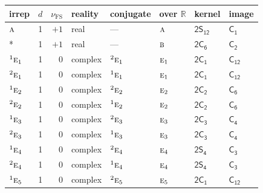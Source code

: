 \documentclass[10pt,a4paper]{article}
\numberwithin{equation}{section}
\newcommand{\grp}[1]{\mathsf{#1}}
\newcommand{\irr}[1]{\text{\normalfont\scshape #1}}
\newcommand{\conjpair}[1]{{}^{#1}}
\newcommand{\detbox}[1]{{\setlength{\fboxsep}{1pt}\fbox{#1}}}
\newcommand{\fsind}{\nu_{\mathrm{FS}}}
\begin{document}
{\small\renewcommand{\arraystretch}{1.25}\setlength{\tabcolsep}{4pt}\begin{longtable}{@{}lrrlllll@{}}\toprule
irrep & $d$ & $\fsind$ & reality & conjugate & over $\mathbb{R}$ & kernel & image\\\midrule\endhead
\bottomrule\endfoot\endlastfoot
$\irr{a}$ & 1 & $+1$ & real & --- & $\irr{a}$ & \href{2S12.pdf}{$\grp{2S_{12}}$} & \href{../../../rotation/data/pdf/C1.pdf}{$\grp{C_{1}}$}\\*
\detbox{$\irr{b}$} & 1 & $+1$ & real & --- & $\irr{b}$ & \href{2C6.pdf}{$\grp{2C_{6}}$} & \href{../../../rotation/data/pdf/C2.pdf}{$\grp{C_{2}}$}\\
$\conjpair{1}\irr{e}_{1}$ & 1 & $0$ & complex & $\conjpair{2}\irr{e}_{1}$ & $\irr{e}_{1}$ & \href{2C1.pdf}{$\grp{2C_{1}}$} & \href{../../../rotation/data/pdf/C12.pdf}{$\grp{C_{12}}$}\\
$\conjpair{2}\irr{e}_{1}$ & 1 & $0$ & complex & $\conjpair{1}\irr{e}_{1}$ & $\irr{e}_{1}$ & \href{2C1.pdf}{$\grp{2C_{1}}$} & \href{../../../rotation/data/pdf/C12.pdf}{$\grp{C_{12}}$}\\
$\conjpair{1}\irr{e}_{2}$ & 1 & $0$ & complex & $\conjpair{2}\irr{e}_{2}$ & $\irr{e}_{2}$ & \href{2C2.pdf}{$\grp{2C_{2}}$} & \href{../../../rotation/data/pdf/C6.pdf}{$\grp{C_{6}}$}\\
$\conjpair{2}\irr{e}_{2}$ & 1 & $0$ & complex & $\conjpair{1}\irr{e}_{2}$ & $\irr{e}_{2}$ & \href{2C2.pdf}{$\grp{2C_{2}}$} & \href{../../../rotation/data/pdf/C6.pdf}{$\grp{C_{6}}$}\\
$\conjpair{1}\irr{e}_{3}$ & 1 & $0$ & complex & $\conjpair{2}\irr{e}_{3}$ & $\irr{e}_{3}$ & \href{2C3.pdf}{$\grp{2C_{3}}$} & \href{../../../rotation/data/pdf/C4.pdf}{$\grp{C_{4}}$}\\
$\conjpair{2}\irr{e}_{3}$ & 1 & $0$ & complex & $\conjpair{1}\irr{e}_{3}$ & $\irr{e}_{3}$ & \href{2C3.pdf}{$\grp{2C_{3}}$} & \href{../../../rotation/data/pdf/C4.pdf}{$\grp{C_{4}}$}\\
$\conjpair{1}\irr{e}_{4}$ & 1 & $0$ & complex & $\conjpair{2}\irr{e}_{4}$ & $\irr{e}_{4}$ & \href{2S4.pdf}{$\grp{2S_{4}}$} & \href{../../../rotation/data/pdf/C3.pdf}{$\grp{C_{3}}$}\\
$\conjpair{2}\irr{e}_{4}$ & 1 & $0$ & complex & $\conjpair{1}\irr{e}_{4}$ & $\irr{e}_{4}$ & \href{2S4.pdf}{$\grp{2S_{4}}$} & \href{../../../rotation/data/pdf/C3.pdf}{$\grp{C_{3}}$}\\
$\conjpair{1}\irr{e}_{5}$ & 1 & $0$ & complex & $\conjpair{2}\irr{e}_{5}$ & $\irr{e}_{5}$ & \href{2C1.pdf}{$\grp{2C_{1}}$} & \href{../../../rotation/data/pdf/C12.pdf}{$\grp{C_{12}}$}\\

\end{longtable}}
\end{document}
